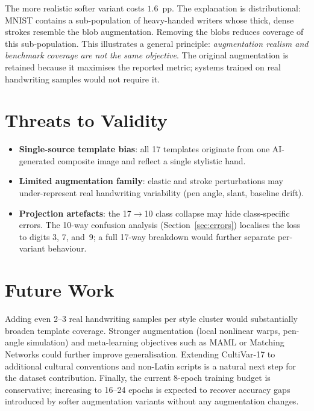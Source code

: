 \documentclass[final,5p,times,twocolumn]{elsarticle}
\begin{document}
The more realistic softer variant costs $1.6$~pp.
The explanation is distributional: MNIST contains a sub-population of heavy-handed writers
whose thick, dense strokes resemble the blob augmentation.
Removing the blobs reduces coverage of this sub-population.
This illustrates a general principle: \emph{augmentation realism and benchmark coverage are
not the same objective}.
The original augmentation is retained because it maximises the reported metric; systems
trained on real handwriting samples would not require it.

\section{Threats to Validity}

\begin{itemize}
  \item \textbf{Single-source template bias}: all 17 templates originate from one
        AI-generated composite image and reflect a single stylistic hand.
  \item \textbf{Limited augmentation family}: elastic and stroke perturbations may
        under-represent real handwriting variability (pen angle, slant, baseline drift).
  \item \textbf{Projection artefacts}: the 17$\to$10 class collapse may hide class-specific
        errors. The 10-way confusion analysis (Section~\ref{sec:errors}) localises the loss
        to digits 3, 7, and~9; a full 17-way breakdown would further separate per-variant
        behaviour.
\end{itemize}

\section{Future Work}

Adding even 2--3 real handwriting samples per style cluster would substantially broaden
template coverage.
Stronger augmentation (local nonlinear warps, pen-angle simulation) and meta-learning
objectives such as MAML \cite{Finn2017} or Matching Networks \cite{Vinyals2016} could
further improve generalisation.
Extending CultiVar-17 to additional cultural conventions and non-Latin scripts is a natural
next step for the dataset contribution.
Finally, the current 8-epoch training budget is conservative; increasing to 16--24 epochs
is expected to recover accuracy gaps introduced by softer augmentation variants without
any augmentation changes.
\end{document}
